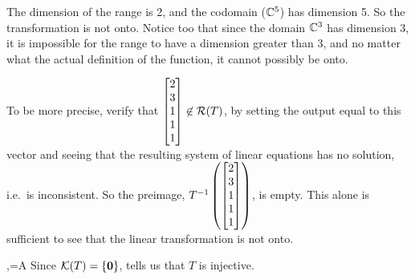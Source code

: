 %
{}
%
{The dimension of the range is 2, and the codomain (${\mathbb C}\sp{5}$) has dimension 5.  So the transformation is not onto.  Notice too that since the domain ${\mathbb C}\sp{3}$ has dimension 3, it is impossible for the range to have a dimension greater than 3, and no matter what the actual definition of the function, it cannot possibly be onto.\par
%
To be more precise, verify that $\begin{bmatrix}2\\3\\1\\1\\1\end{bmatrix}\not\in\mathcal{R}\!\protect\left(T\protect\right)$, by setting the output equal to this vector and seeing that the resulting system of linear equations has no solution, i.e.\ is inconsistent.  So the preimage, $T\sp{-1}\protect\left(\begin{bmatrix}2\\3\\1\\1\\1\end{bmatrix}\protect\right)$, is empty.  This alone is sufficient to see that the linear transformation is not onto.
}
%
%
%
\ltmatrixrepresentation
{,\quad{}=A}
{}
%
\newpage
%
%
%
%
%
%
%
%
{Since $\mathcal{K}\!\protect\left(T\protect\right)=\protect\left\{{\bf0}\protect\right\}$,  tells us that $T$ is injective.
}
%
